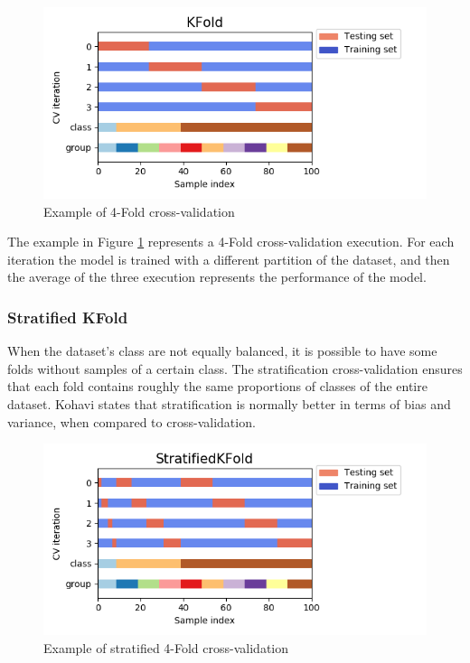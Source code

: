 \begin{figure}[!h]
	\centering
	\includegraphics[width=1.0\columnwidth]{kfold2}
	\caption{Example of 4-Fold cross-validation}
	\label{fig:kfold}
\end{figure}

The example in Figure \ref{fig:kfold} represents a 4-Fold cross-validation execution. For each iteration the model is trained with a different partition of the dataset, and then the average of the three execution represents the performance of the model.

\subsubsection{Stratified KFold}

When the dataset's class are not equally balanced, it is possible to have some folds without samples of a certain class. The stratification cross-validation ensures that each fold contains roughly the same proportions of classes of the entire dataset. Kohavi \cite{kohavi1995study} states that stratification is normally better in terms of bias and variance, when compared to cross-validation.

\begin{figure}[!h]
	\centering
	\includegraphics[width=1.0\columnwidth]{stratified}
	\caption{Example of stratified 4-Fold cross-validation}
	\label{fig:stratified}
\end{figure}

